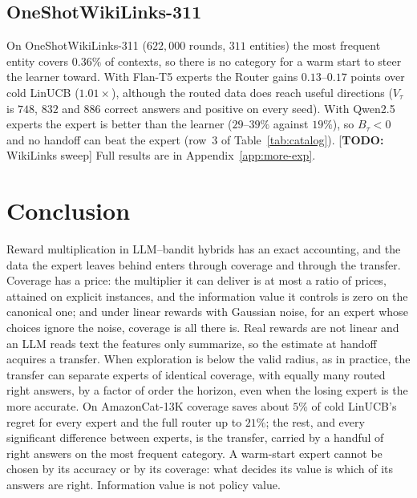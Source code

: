 \documentclass{article}
\theoremstyle{definition}
\theoremstyle{remark}
\theoremstyle{remark}
\newcommand{\todo}[1]{\textcolor{red!70!black}{[\textbf{TODO:} #1]}}
\begin{document}
\subsection{OneShotWikiLinks-311}
\label{sec:wiki}

On OneShotWikiLinks-311 ($622{,}000$ rounds, $311$ entities) the most
frequent entity covers $0.36\%$ of contexts, so there is no category for a
warm start to steer the learner toward. With Flan-T5 experts the Router
gains $0.13$--$0.17$ points over cold LinUCB ($1.01\times$), although the
routed data does reach useful directions ($V_\tau$ is $748$, $832$ and $886$
correct answers and positive on every seed). With Qwen2.5 experts the expert
is better than the learner ($29$--$39\%$ against $19\%$), so $B_\tau<0$ and no
handoff can beat the expert (row~3 of Table~\ref{tab:catalog}).
\todo{WikiLinks sweep} Full results are in Appendix~\ref{app:more-exp}.

\section{Conclusion}
\label{sec:conclusion}

Reward multiplication in LLM--bandit hybrids has an exact accounting, and the
data the expert leaves behind enters through coverage and through the
transfer. Coverage has a price: the multiplier it can deliver is at most a
ratio of prices, attained on explicit instances, and the information value
it controls is zero on the canonical one; and under linear rewards with
Gaussian noise, for an expert whose choices ignore the noise, coverage is all
there is. Real rewards are not linear and an LLM reads
text the features only summarize, so the estimate at handoff acquires a
transfer. When exploration is below the valid radius, as in practice, the
transfer can separate experts of identical coverage, with equally many routed
right answers, by a factor of order the horizon, even when the losing expert
is the more accurate. On AmazonCat-13K coverage saves about $5\%$ of
cold LinUCB's regret for every expert and the full router up to $21\%$; the
rest, and every significant difference between experts, is the transfer,
carried by a handful of right answers on the most frequent category. A
warm-start expert cannot be chosen by its accuracy or by its coverage: what
decides its value is which of its answers are right. Information value is
not policy value.
\end{document}
